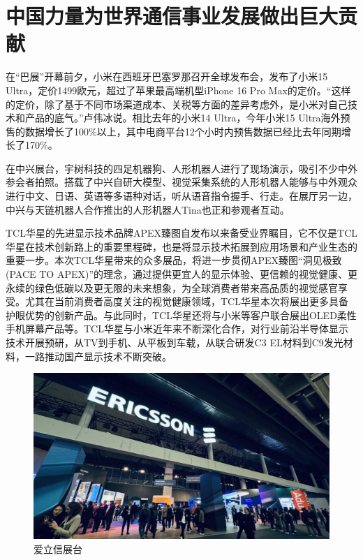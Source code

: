\documentclass{article}
\begin{document}
\section*{中国力量为世界通信事业发展做出巨大贡献}
在“巴展”开幕前夕，小米在西班牙巴塞罗那召开全球发布会，发布了小米15 Ultra，定价1499欧元，超过了苹果最高端机型iPhone 16 Pro Max的定价。“这样的定价，除了基于不同市场渠道成本、关税等方面的差异考虑外，是小米对自己技术和产品的底气。”卢伟冰说。相比去年的小米14 Ultra，今年小米15 Ultra海外预售的数据增长了100\%以上，其中电商平台12个小时内预售数据已经比去年同期增长了170\%。\par
在中兴展台，宇树科技的四足机器狗、人形机器人进行了现场演示，吸引不少中外参会者拍照。搭载了中兴自研大模型、视觉采集系统的人形机器人能够与中外观众进行中文、日语、英语等多语种对话，听从语音指令握手、行走。在展厅另一边，中兴与天链机器人合作推出的人形机器人Tina也正和参观者互动\cite{news2}。\par
TCL华星的先进显示技术品牌APEX臻图自发布以来备受业界瞩目，它不仅是TCL华星在技术创新路上的重要里程碑，也是将显示技术拓展到应用场景和产业生态的重要一步。本次TCL华星带来的众多展品，将进一步贯彻APEX臻图“洞见极致(PACE TO APEX)”的理念，通过提供更宜人的显示体验、更信赖的视觉健康、更永续的绿色低碳以及更无限的未来想象，为全球消费者带来高品质的视觉感官享受。尤其在当前消费者高度关注的视觉健康领域，TCL华星本次将展出更多具备护眼优势的创新产品。与此同时，TCL华星还将与小米等客户联合展出OLED柔性手机屏幕产品等。TCL华星与小米近年来不断深化合作，对行业前沿半导体显示技术开展预研，从TV到手机、从平板到车载，从联合研发C3 EL材料到C9发光材料，一路推动国产显示技术不断突破\cite{news3}。\par
\begin{figure}[H]
\begin{center}
\includegraphics[scale=1]{图2.png}
\caption{爱立信展台}
\end{center}
\end{figure}
\end{document}
